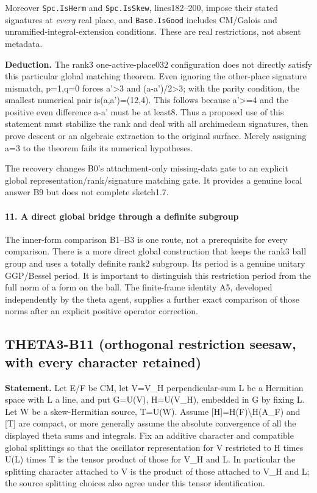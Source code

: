 Moreover \texttt{Spc.IsHerm} and \texttt{Spc.IsSkew}, lines182--200, impose their stated signatures at \emph{every} real place, and \texttt{Base.IsGood} includes CM/Galois and unramified-integral-extension conditions. These are real restrictions, not absent metadata.

\textbf{Deduction.} The rank3 one-active-place032 configuration does not directly satisfy this particular global matching theorem. Even ignoring the other-place signature mismatch, p=1,q=0 forces a'\textgreater3 and (a-a')/2\textgreater3; with the parity condition, the smallest numerical pair is(a,a')=(12,4). This follows because a'\textgreater=4 and the positive even difference a-a' must be at least8. Thus a proposed use of this statement must stabilize the rank and deal with all archimedean signatures, then prove descent or an algebraic extraction to the original surface. Merely assigning a=3 to the theorem fails its numerical hypotheses.

The recovery changes B0's attachment-only missing-data gate to an explicit global representation/rank/signature matching gate. It provides a genuine local answer B9 but does not complete sketch1.7.

\paragraph{11. A direct global bridge through a definite subgroup}\label{a-direct-global-bridge-through-a-definite-subgroup}

The inner-form comparison B1--B3 is one route, not a prerequisite for every comparison. There is a more direct global construction that keeps the rank3 ball group and uses a totally definite rank2 subgroup. Its period is a genuine unitary GGP/Bessel period. It is important to distinguish this restriction period from the full norm of a form on the ball. The finite-frame identity A5, developed independently by the theta agent, supplies a further exact comparison of those norms after an explicit positive operator correction.

\subsection{THETA3-B11 (orthogonal restriction seesaw, with every character retained)}\label{theta3-b11-orthogonal-restriction-seesaw-with-every-character-retained}\label{B11}

\textbf{Statement.} Let E/F be CM, let V=V\_H perpendicular-sum L be a Hermitian space with L a line, and put G=U(V), H=U(V\_H), embedded in G by fixing L. Let W be a skew-Hermitian source, T=U(W). Assume {[}H{]}=H(F)\textbackslash H(A\_F) and {[}T{]} are compact, or more generally assume the absolute convergence of all the displayed theta sums and integrals. Fix an additive character and compatible global splittings so that the oscillator representation for V restricted to H times U(L) times T is the tensor product of those for V\_H and L. In particular the splitting character attached to V is the product of those attached to V\_H and L; the source splitting choices also agree under this tensor identification.


